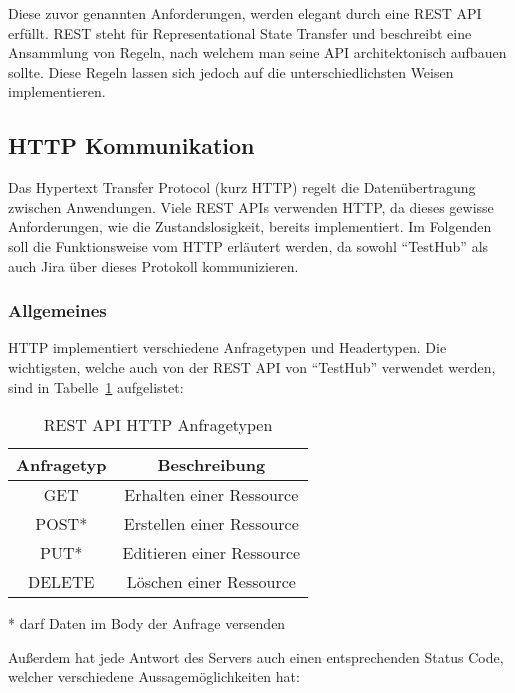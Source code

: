 Diese zuvor genannten Anforderungen, werden elegant durch eine \gls{REST} \gls{API}
erfüllt. REST steht für Representational State Transfer und beschreibt eine Ansammlung von
Regeln, nach welchem man seine \gls{API} architektonisch aufbauen sollte. Diese 
Regeln lassen sich jedoch auf die unterschiedlichsten Weisen implementieren. 

\subsection{HTTP Kommunikation}\label{sec:HTTP}
Das Hypertext Transfer Protocol (kurz HTTP) regelt die Datenübertragung zwischen
Anwendungen. Viele \gls{REST} \gls{API}s verwenden HTTP, da dieses gewisse
Anforderungen, wie die Zustandslosigkeit, bereits implementiert. Im Folgenden soll
die Funktionsweise vom HTTP erläutert werden, da sowohl ``TestHub'' als auch 
Jira über dieses Protokoll kommunizieren.

\subsubsection{Allgemeines}
\gls{HTTP} implementiert verschiedene Anfragetypen und Headertypen. Die wichtigsten,
welche auch von der \gls{REST} \gls{API} von ``TestHub'' verwendet werden, sind 
in Tabelle~\ref{table:requests} aufgelistet:

\begin{table}[H]
    \centering
    \begin{tabular}{|c | c|} 
     \hline
     \textbf{Anfragetyp} & \textbf{Beschreibung} \\ [1ex] 
     \hline
     GET & Erhalten einer Ressource \\ [1ex]
     \hline
     POST* & Erstellen einer Ressource \\ [1ex] 
     \hline
     PUT* & Editieren einer Ressource \\ [1ex] 
     \hline
     DELETE & Löschen einer Ressource \\ [1ex] 
     \hline
    \end{tabular}
    \caption{REST API HTTP Anfragetypen}
    * darf Daten im Body der Anfrage versenden
    \label{table:requests}
\end{table}

Außerdem hat jede Antwort des Servers auch einen entsprechenden Status Code, 
welcher verschiedene Aussagemöglichkeiten hat:


